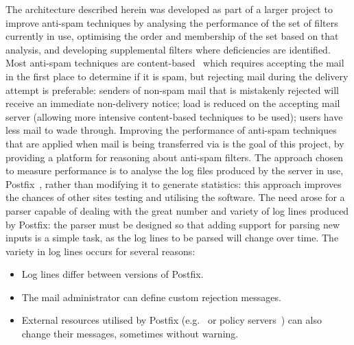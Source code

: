 \documentclass{svmult}
\begin{document}
The architecture described herein was developed as part of a larger project
to improve anti-spam techniques by analysing the performance of the set of
filters currently in use, optimising the order and membership of the set
based on that analysis, and developing supplemental filters where
deficiencies are identified.  Most anti-spam techniques are
content-based~\cite{a-plan-for-spam, word-stemming, relaxed-online-svms}
which requires accepting the mail in the first place to determine if it is
spam, but rejecting mail during the delivery attempt is preferable: senders
of non-spam mail that is mistakenly rejected will receive an immediate
non-delivery notice; load is reduced on the accepting mail server (allowing
more intensive content-based techniques to be used); users have less mail
to wade through.  Improving the performance of anti-spam techniques that
are applied when mail is being transferred via \SMTP{}\footnotemark{} is
the goal of this project, by providing a platform for reasoning about
anti-spam filters.  The approach chosen to measure performance is to
analyse the log files produced by the \SMTP{} server in use,
Postfix~\cite{postfix}, rather than modifying it to generate statistics:
this approach improves the chances of other sites testing and utilising the
software.  The need arose for a parser capable of dealing with the great
number and variety of log lines produced by Postfix: the parser must be
designed so that adding support for parsing new inputs is a simple task, as
the log lines to be parsed will change over time.  The variety in log lines
occurs for several reasons:

\begin{itemize}

    \item Log lines differ between versions of Postfix.
        
    \item The mail administrator can define custom rejection messages.

    \item External resources utilised by Postfix (e.g.\ \DNSBL{} or policy
        servers~\cite{policy-servers}) can also change their messages,
        sometimes without warning.

\end{itemize}
\end{document}
